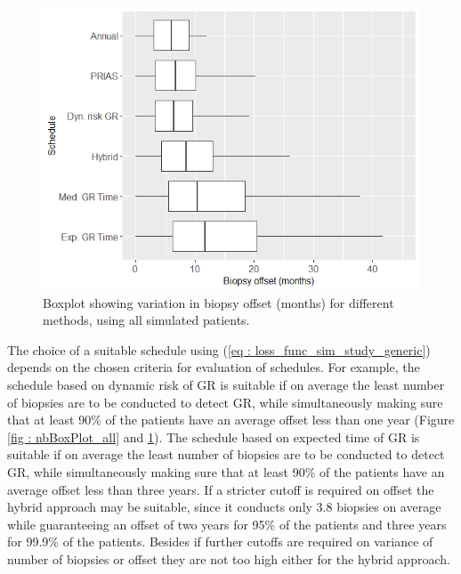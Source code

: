 \begin{figure}[!htb]
\centerline{\includegraphics[width=\columnwidth]{images/sim_study/offsetBoxPlot_all.png}}
\caption{Boxplot showing variation in biopsy offset (months) for different methods, using all simulated patients.}
\label{fig : offsetBoxPlot_all}
\end{figure}

The choice of a suitable schedule using (\ref{eq : loss_func_sim_study_generic}) depends on the chosen criteria for evaluation of schedules. For example, the schedule based on dynamic risk of GR is suitable if on average the least number of biopsies are to be conducted to detect GR, while simultaneously making sure that at least 90\% of the patients have an average offset less than one year (Figure \ref{fig : nbBoxPlot_all} and \ref{fig : offsetBoxPlot_all}). The schedule based on expected time of GR is suitable if on average the least number of biopsies are to be conducted to detect GR, while simultaneously making sure that at least 90\% of the patients have an average offset less than three years. If a stricter cutoff is required on offset the hybrid approach may be suitable, since it conducts only 3.8 biopsies on average while guaranteeing an offset of two years for 95\% of the patients and three years for 99.9\% of the patients. Besides if further cutoffs are required on variance of number of biopsies or offset they are not too high either for the hybrid approach.